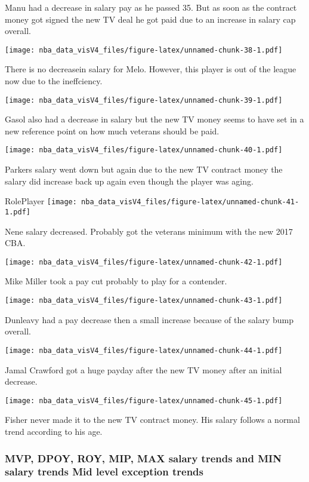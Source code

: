 \documentclass[]{article}
\begin{document}
Manu had a decrease in salary pay as he passed 35. But as soon as the
contract money got signed the new TV deal he got paid due to an increase
in salary cap overall.

\texttt{[image: nba\_data\_visV4\_files/figure-latex/unnamed-chunk-38-1.pdf]}

There is no decreasein salary for Melo. However, this player is out of
the league now due to the ineffciency.

\texttt{[image: nba\_data\_visV4\_files/figure-latex/unnamed-chunk-39-1.pdf]}

Gasol also had a decrease in salary but the new TV money seems to have
set in a new reference point on how much veterans should be paid.

\texttt{[image: nba\_data\_visV4\_files/figure-latex/unnamed-chunk-40-1.pdf]}

Parkers salary went down but again due to the new TV contract money the
salary did increase back up again even though the player was aging.

RolePlayer
\texttt{[image: nba\_data\_visV4\_files/figure-latex/unnamed-chunk-41-1.pdf]}

Nene salary decreased. Probably got the veterans minimum with the new
2017 CBA.

\texttt{[image: nba\_data\_visV4\_files/figure-latex/unnamed-chunk-42-1.pdf]}

Mike Miller took a pay cut probably to play for a contender.

\texttt{[image: nba\_data\_visV4\_files/figure-latex/unnamed-chunk-43-1.pdf]}

Dunleavy had a pay decrease then a small increase because of the salary
bump overall.

\texttt{[image: nba\_data\_visV4\_files/figure-latex/unnamed-chunk-44-1.pdf]}

Jamal Crawford got a huge payday after the new TV money after an initial
decrease.

\texttt{[image: nba\_data\_visV4\_files/figure-latex/unnamed-chunk-45-1.pdf]}

Fisher never made it to the new TV contract money. His salary follows a
normal trend according to his age.

\subsubsection{MVP, DPOY, ROY, MIP, MAX salary trends and MIN salary
trends Mid level exception
trends}\label{mvp-dpoy-roy-mip-max-salary-trends-and-min-salary-trends-mid-level-exception-trends}
\end{document}
